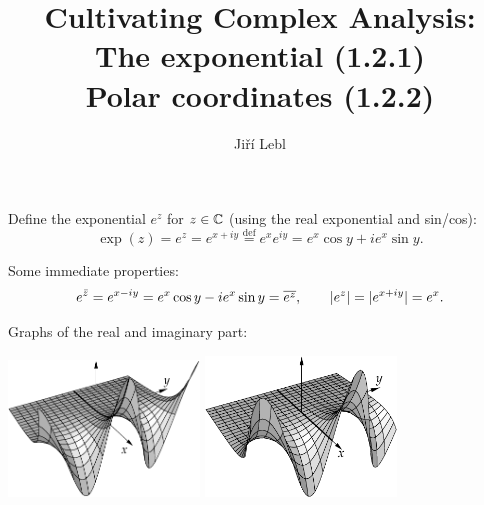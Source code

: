 \documentclass[10pt,aspectratio=169]{beamer}
\author{Ji\v{r}\'i Lebl}
\institute[OSU]{%
Departemento pri Matematiko de Oklahoma {\^S}tata Universitato}
\title{Cultivating Complex Analysis:\\%
The exponential (1.2.1)\\%
Polar coordinates (1.2.2)}
\date{}
\begin{document}
\begin{frame}
\titlepage
\end{frame}

\begin{frame}
Define
the exponential $e^z$ for $z \in {\mathbb{C}}$ (using the real exponential and
sin/cos):
\begin{equation*}
\exp(z) =
e^{z} = 
e^{x+iy}
\overset{\text{def}}{=}
e^x e^{iy}
=
e^x\cos y + i e^x \sin y .
\end{equation*}

\medskip
\pause
Some immediate properties:
\begin{equation*}
e^{\bar{z}} = 
e^{x-iy} =
e^x\cos y - i e^x \sin y  = \overline{e^{z}} ,
\qquad
\lvert {e^{z}} \rvert = 
\lvert {e^{x+iy}} \rvert =
e^x .
\end{equation*}

\pause
\medskip

Graphs of the real and imaginary part:

\begin{center}
\includegraphics[width=2.0in]{../figures/realexp}
\qquad
\includegraphics[width=2.0in]{../figures/imagexp}
\end{center}

\end{frame}
\end{document}
